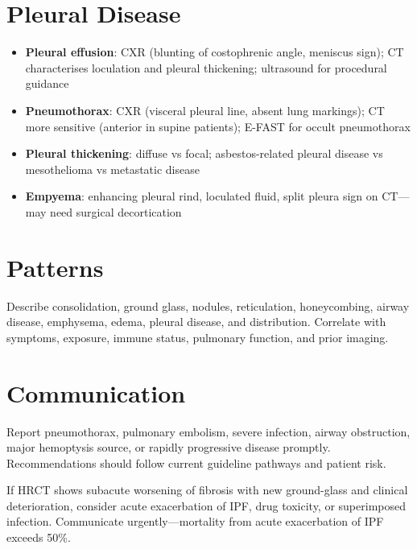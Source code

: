 \section{Pleural Disease}
\begin{itemize}
  \item \textbf{Pleural effusion}: CXR (blunting of costophrenic angle, meniscus sign); CT characterises loculation and pleural thickening; ultrasound for procedural guidance
  \item \textbf{Pneumothorax}: CXR (visceral pleural line, absent lung markings); CT more sensitive (anterior in supine patients); E-FAST for occult pneumothorax
  \item \textbf{Pleural thickening}: diffuse vs focal; asbestos-related pleural disease vs mesothelioma vs metastatic disease
  \item \textbf{Empyema}: enhancing pleural rind, loculated fluid, split pleura sign on CT---may need surgical decortication
\end{itemize}

\section{Patterns}
Describe consolidation, ground glass, nodules, reticulation, honeycombing, airway disease, emphysema, edema, pleural disease, and distribution. Correlate with symptoms, exposure, immune status, pulmonary function, and prior imaging.

\section{Communication}
Report pneumothorax, pulmonary embolism, severe infection, airway obstruction, major hemoptysis source, or rapidly progressive disease promptly. Recommendations should follow current guideline pathways and patient risk.

\begin{pearlbox}
If HRCT shows subacute worsening of fibrosis with new ground-glass and clinical deterioration, consider acute exacerbation of IPF, drug toxicity, or superimposed infection. Communicate urgently---mortality from acute exacerbation of IPF exceeds 50\%.
\end{pearlbox}

\clearpage
